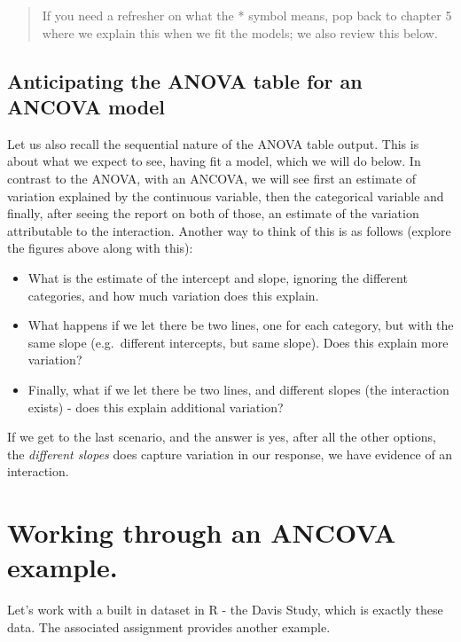 \documentclass[
]{book}
\providecommand{\tightlist}{%
  \setlength{\itemsep}{0pt}\setlength{\parskip}{0pt}}
\begin{document}
\begin{quote}
If you need a refresher on what the * symbol means, pop back to chapter 5 where we explain this when we fit the models; we also review this below.
\end{quote}

\hypertarget{anticipating-the-anova-table-for-an-ancova-model}{%
\subsection{Anticipating the ANOVA table for an ANCOVA model}\label{anticipating-the-anova-table-for-an-ancova-model}}

Let us also recall the sequential nature of the ANOVA table output. This is about what we expect to see, having fit a model, which we will do below. In contrast to the ANOVA, with an ANCOVA, we will see first an estimate of variation explained by the continuous variable, then the categorical variable and finally, after seeing the report on both of those, an estimate of the variation attributable to the interaction. Another way to think of this is as follows (explore the figures above along with this):

\begin{itemize}
\tightlist
\item
  What is the estimate of the intercept and slope, ignoring the different categories, and how much variation does this explain.
\item
  What happens if we let there be two lines, one for each category, but with the same slope (e.g.~different intercepts, but same slope). Does this explain more variation?
\item
  Finally, what if we let there be two lines, and different slopes (the interaction exists) - does this explain additional variation?
\end{itemize}

If we get to the last scenario, and the answer is yes, after all the other options, the \emph{different slopes} does capture variation in our response, we have evidence of an interaction.

\hypertarget{working-through-an-ancova-example.}{%
\section{Working through an ANCOVA example.}\label{working-through-an-ancova-example.}}

Let's work with a built in dataset in R - the Davis Study, which is exactly these data. The associated assignment provides another example.
\end{document}
